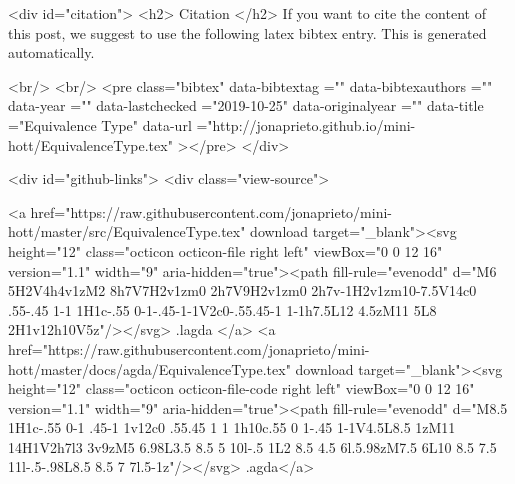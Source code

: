   
  <div id="citation">
  <h2> Citation </h2>
  If you want to cite the content of this post,
  we suggest to use the following latex bibtex entry.
  This is generated automatically.

  <br/>
  <br/>
  <pre class="bibtex"
       data-bibtextag =""
       data-bibtexauthors =""
       data-year =""
       data-lastchecked ="2019-10-25"
       data-originalyear =""
       data-title ="Equivalence Type"
       data-url ="http://jonaprieto.github.io/mini-hott/EquivalenceType.tex"
  ></pre>
  </div>
  

  <div id="github-links">
    <div class="view-source">
      
        <a href="https://raw.githubusercontent.com/jonaprieto/mini-hott/master/src/EquivalenceType.tex" download target="_blank"><svg height="12" class="octicon octicon-file right left" viewBox="0 0 12 16" version="1.1" width="9" aria-hidden="true"><path fill-rule="evenodd" d="M6 5H2V4h4v1zM2 8h7V7H2v1zm0 2h7V9H2v1zm0 2h7v-1H2v1zm10-7.5V14c0 .55-.45 1-1 1H1c-.55 0-1-.45-1-1V2c0-.55.45-1 1-1h7.5L12 4.5zM11 5L8 2H1v12h10V5z"/></svg> .lagda </a>
        <a href="https://raw.githubusercontent.com/jonaprieto/mini-hott/master/docs/agda/EquivalenceType.tex" download target="_blank"><svg height="12" class="octicon octicon-file-code right left" viewBox="0 0 12 16" version="1.1" width="9" aria-hidden="true"><path fill-rule="evenodd" d="M8.5 1H1c-.55 0-1 .45-1 1v12c0 .55.45 1 1 1h10c.55 0 1-.45 1-1V4.5L8.5 1zM11 14H1V2h7l3 3v9zM5 6.98L3.5 8.5 5 10l-.5 1L2 8.5 4.5 6l.5.98zM7.5 6L10 8.5 7.5 11l-.5-.98L8.5 8.5 7 7l.5-1z"/></svg> .agda</a>
      
